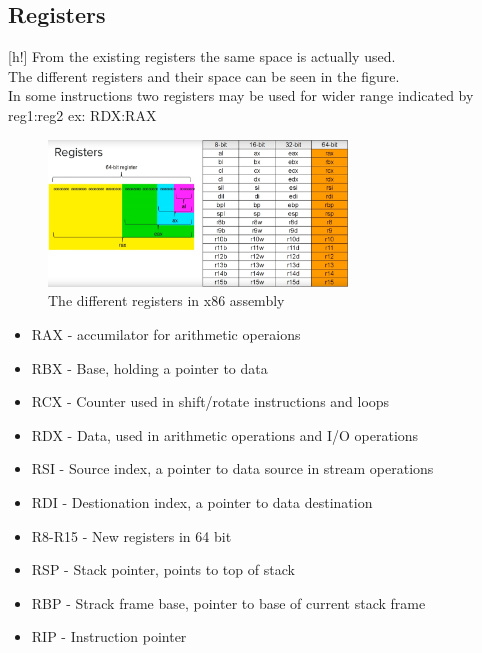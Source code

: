 \documentclass[12pt, a4paper]{article}
\begin{document}
		\subsection{Registers}[h!]
			From the existing registers the same space is actually used.\\
			The different registers and their space can be seen in the figure.\\
			In some instructions two registers may be used for wider range indicated by reg1:reg2 ex: RDX:RAX
			\begin{figure}
				\centering
				\includegraphics[width=300px]{assets/assemblyRegisters.png}
				\caption{The different registers in x86 assembly}
			\end{figure}
			\begin{itemize}
				\item RAX - accumilator for arithmetic operaions
				\item RBX - Base, holding a pointer to data
				\item RCX - Counter used in shift/rotate instructions and loops
				\item RDX - Data, used in arithmetic operations and I/O operations
				\item RSI - Source index, a pointer to data source in stream operations
				\item RDI - Destionation index, a pointer to data destination
				\item R8-R15 - New registers in 64 bit
				\item RSP - Stack pointer, points to top of stack
				\item RBP - Strack frame base, pointer to base of current stack frame
				\item RIP - Instruction pointer
			\end{itemize}
\end{document}
